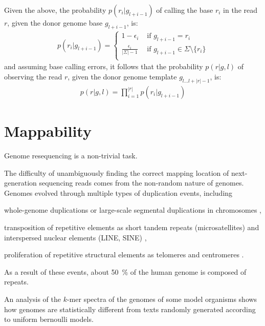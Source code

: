 Given the above, the probability $p(r_i | g_{l+i-1})$ of calling the base $r_i$ in the read $r$, given the donor genome base $g_{l+i-1}$, is:
\begin{eqnarray}
p(r_i | g_{l+i-1}) = \left\{
\begin{array}{ll}
1-\epsilon_i                  & \text{ if } g_{l+i-1} = r_i\\
\frac{\epsilon_i}{|\Sigma|-1} & \text{ if } g_{l+i-1} \in \Sigma \setminus \{r_i\}\\
\end{array}
\right.
\end{eqnarray}
and assuming \iid base calling errors, it follows that the probability $p(r | g, l)$ of observing the read $r$, given the donor genome template $g_{l \dots l+|r|-1}$, is:
\begin{eqnarray}
\label{eq:phred}
p(r | g, l) = \prod_{i=1}^{|r|}{p(r_i | g_{l+i-1})}
\end{eqnarray}


\section{Mappability}
\label{sec:mappability}

Genome resequencing is a non-trivial task.

The difficulty of unambiguously finding the correct mapping location of next-generation sequencing reads comes from the non-random nature of genomes.
Genomes evolved through multiple types of duplication events, including
\begin{inparaenum}[(i)]
\item whole-genome duplications \citep{?} or large-scale segmental duplications in chromosomes \citep{?},
\item transposition of repetitive elements as short tandem repeats (microsatellites) and interspersed nuclear elements (LINE, SINE) \citep{?},
\item proliferation of repetitive structural elements as telomeres and centromeres \citep{?}.
\end{inparaenum}
As a result of these events, about 50~\% of the human genome is composed of repeats.

An analysis of the $k$-mer spectra of the genomes of some model organisms shows how genomes are statistically different from texts randomly generated according to uniform bernoulli models.

